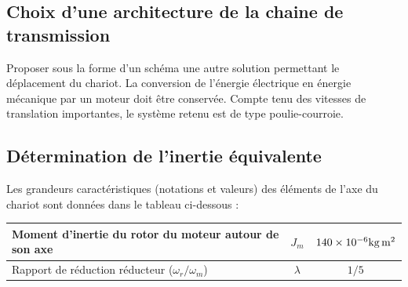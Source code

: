 \documentclass[10pt,fleqn]{article} %
\begin{document}
\subsection*{Choix d’une architecture de la chaine de transmission}
Proposer sous la forme d’un schéma une autre solution permettant le déplacement du chariot. La conversion de l’énergie électrique en énergie mécanique par un moteur doit être conservée.
Compte tenu des vitesses de translation importantes, le système retenu est de type poulie-courroie.

\subsection*{Détermination de l’inertie équivalente} 
Les grandeurs caractéristiques (notations et valeurs) des éléments de l’axe du chariot sont données dans le tableau ci-dessous :
\begin{center}
\begin{tabular}{|p{3cm}|c|c|}
Moment d’inertie du rotor du moteur autour de son axe&	$J_m$ & $\num{140d-6}\si{kg.m^2}$ \\ \hline
Rapport de réduction réducteur ($\omega_r/\omega_m$)	& $\lambda$	&$1/5$ \\ \hline
\end{tabular}
\end{center}
\end{document}
